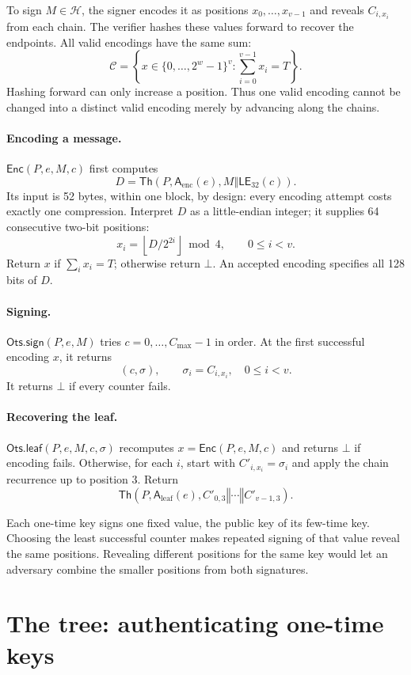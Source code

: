 \documentclass[11pt]{article}
\theoremstyle{plain}
\theoremstyle{definition}
\newcommand{\Th}{\mathsf{Th}}
\newcommand{\Enc}{\mathsf{Enc}}
\newcommand{\LE}{\mathsf{LE}}
\newcommand{\concat}{\mathbin\Vert}
\newcommand{\addr}{\mathsf{A}}
\newcommand{\cmax}{C_{\max}}
\newcommand{\OtsSign}{\mathsf{Ots.sign}}
\newcommand{\OtsLeaf}{\mathsf{Ots.leaf}}
\begin{document}
To sign $M\in\mathcal H$, the signer encodes it as positions $x_0,\ldots,x_{v-1}$ and reveals $C_{i,x_i}$ from each chain. The verifier hashes these values forward to recover the endpoints. All valid encodings have the same sum:
\[
  \mathcal C=\left\{x\in\{0,\ldots,2^w-1\}^{v}:\sum_{i=0}^{v-1}x_i=T\right\}.
\]
Hashing forward can only increase a position. Thus one valid encoding cannot be changed into a distinct valid encoding merely by advancing along the chains.

\paragraph{Encoding a message.}
$\Enc(P,e,M,c)$ first computes
\[
  D=\Th\!\left(P,\addr_{\mathrm{enc}}(e),M\concat\LE_{32}(c)\right).
\]
Its input is 52 bytes, within one block, by design: every encoding attempt costs exactly one compression. Interpret $D$ as a little-endian integer; it supplies 64 consecutive two-bit positions:
\[
  x_i=\left\lfloor D/2^{2i}\right\rfloor\bmod 4,\qquad 0\leq i<v.
\]
Return $x$ if $\sum_i x_i=T$; otherwise return $\bot$. An accepted encoding specifies all 128 bits of $D$.

\paragraph{Signing.}
$\OtsSign(P,e,M)$ tries $c=0,\ldots,\cmax-1$ in order. At the first successful encoding $x$, it returns
\[
  (c,\sigma),\qquad \sigma_i=C_{i,x_i},\quad 0\leq i<v.
\]
It returns $\bot$ if every counter fails.

\paragraph{Recovering the leaf.}
$\OtsLeaf(P,e,M,c,\sigma)$ recomputes $x=\Enc(P,e,M,c)$ and returns $\bot$ if encoding fails. Otherwise, for each $i$, start with $C'_{i,x_i}=\sigma_i$ and apply the chain recurrence up to position $3$. Return
\[
  \Th\!\left(P,\addr_{\mathrm{leaf}}(e),C'_{0,3}\concat\cdots\concat C'_{v-1,3}\right).
\]

\label{rem:once}
Each one-time key signs one fixed value, the public key of its few-time key. Choosing the least successful counter makes repeated signing of that value reveal the same positions. Revealing different positions for the same key would let an adversary combine the smaller positions from both signatures.

\section{The tree: authenticating one-time keys}
\label{sec:layer}
\end{document}
